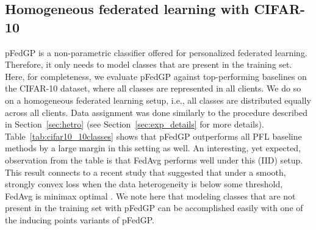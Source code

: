 \documentclass{article}
\def\Secref#1{Section~\ref{#1}}
\newcommand{\tblref}[1]{Table~\ref{#1}}
\begin{document}
\subsection{Homogeneous federated learning with CIFAR-10} \label{sec:cifar10_iid}
pFedGP is a non-parametric classifier offered for personalized federated learning. Therefore, it only needs to model classes that are present in the training set. Here, for completeness, we evaluate pFedGP against top-performing baselines on the CIFAR-10 dataset, where all classes are represented in all clients. We do so on a homogeneous federated learning setup, i.e., all classes are distributed equally across all clients. Data assignment was done similarly to the procedure described in \Secref{sec:hetro} (see \Secref{sec:exp_details} for more details). \tblref{tab:cifar10_10classes} shows that pFedGP outperforms all PFL baseline methods by a large margin in this setting as well. An interesting, yet expected, observation from the table is that FedAvg performs well under this (IID) setup. This result connects to a recent study that suggested that under a smooth, strongly convex loss when the data heterogeneity is below some threshold, FedAvg is minimax optimal \cite{chen2021theorem}. We note here that modeling classes that are not present in the training set with pFedGP can be accomplished easily with one of the inducing points variants of pFedGP.
\end{document}
